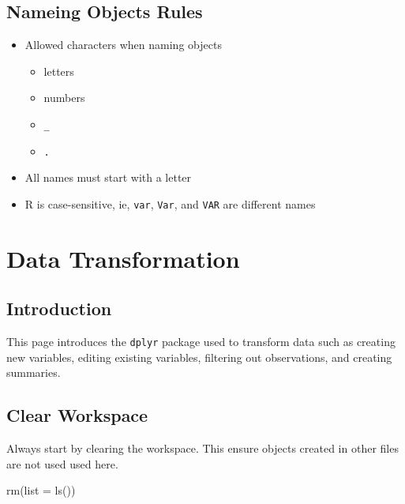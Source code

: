 \documentclass[
  letterpaper,
  DIV=11,
  numbers=noendperiod]{scrreprt}
\newenvironment{Shaded}{\begin{snugshade}}{\end{snugshade}}
\newcommand{\AttributeTok}[1]{\textcolor[rgb]{0.40,0.45,0.13}{#1}}
\newcommand{\FunctionTok}[1]{\textcolor[rgb]{0.28,0.35,0.67}{#1}}
\newcommand{\NormalTok}[1]{\textcolor[rgb]{0.00,0.23,0.31}{#1}}
\providecommand{\tightlist}{%
  \setlength{\itemsep}{0pt}\setlength{\parskip}{0pt}}\usepackage{longtable,booktabs,array}
\begin{document}
\section{Nameing Objects Rules}\label{nameing-objects-rules}

\begin{itemize}
\tightlist
\item
  Allowed characters when naming objects

  \begin{itemize}
  \tightlist
  \item
    letters
  \item
    numbers
  \item
    \texttt{\_}
  \item
    \texttt{.}
  \end{itemize}
\item
  All names must start with a letter
\item
  R is case-sensitive, ie, \texttt{var}, \texttt{Var}, and \texttt{VAR}
  are different names
\end{itemize}

\chapter{Data Transformation}\label{data-transformation}

\section{Introduction}\label{introduction-2}

This page introduces the \texttt{dplyr} package used to transform data
such as creating new variables, editing existing variables, filtering
out observations, and creating summaries.

\section{Clear Workspace}\label{clear-workspace-3}

Always start by clearing the workspace. This ensure objects created in
other files are not used used here.

\begin{Shaded}
\begin{Highlighting}[]
\FunctionTok{rm}\NormalTok{(}\AttributeTok{list =} \FunctionTok{ls}\NormalTok{())}
\end{Highlighting}
\end{Shaded}
\end{document}

